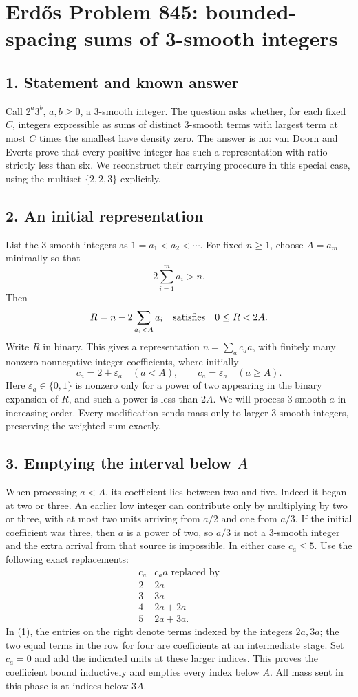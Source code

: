 \section*{Erd\H{o}s Problem 845: bounded-spacing sums of 3-smooth integers}
\subsection*{1. Statement and known answer}
Call $2^a3^b$, $a,b\ge0$, a 3-smooth integer. The question asks whether, for each fixed $C$, integers expressible as sums of distinct 3-smooth terms with largest term at most $C$ times the smallest have density zero. The answer is no: van Doorn and Everts prove that every positive integer has such a representation with ratio strictly less than six. We reconstruct their carrying procedure in this special case, using the multiset $\{2,2,3\}$ explicitly.
\subsection*{2. An initial representation}
List the 3-smooth integers as $1=a_1<a_2<\cdots$. For fixed $n\ge1$, choose $A=a_m$ minimally so that
\[
 2\sum_{i=1}^m a_i>n.
\]
Then
\[
 R=n-2\sum_{a_i<A}a_i
 \quad\hbox{satisfies}\quad 0\le R<2A.
\]
Write $R$ in binary. This gives a representation $n=\sum_a c_a a$, with finitely many nonzero nonnegative integer coefficients, where initially
\[
 c_a=2+\varepsilon_a\quad(a<A),\qquad
 c_a=\varepsilon_a\quad(a\ge A).
\]
Here $\varepsilon_a\in\{0,1\}$ is nonzero only for a power of two appearing in the binary expansion of $R$, and such a power is less than $2A$.
We will process 3-smooth $a$ in increasing order. Every modification sends mass only to larger 3-smooth integers, preserving the weighted sum exactly.
\subsection*{3. Emptying the interval below $A$}
When processing $a<A$, its coefficient lies between two and five. Indeed it began at two or three. An earlier low integer can contribute only by multiplying by two or three, with at most two units arriving from $a/2$ and one from $a/3$. If the initial coefficient was three, then $a$ is a power of two, so $a/3$ is not a 3-smooth integer and the extra arrival from that source is impossible. In either case $c_a\le5$.
Use the following exact replacements:
\[
\begin{array}{c|c}
c_a&c_a a\text{ replaced by}\\\hline
2&2a\\
3&3a\\
4&2a+2a\\
5&2a+3a.
\end{array}                                               \tag{1}
\]
In (1), the entries on the right denote terms indexed by the integers $2a,3a$; the two equal terms in the row for four are coefficients at an intermediate stage. Set $c_a=0$ and add the indicated units at these larger indices. This proves the coefficient bound inductively and empties every index below $A$. All mass sent in this phase is at indices below $3A$.
